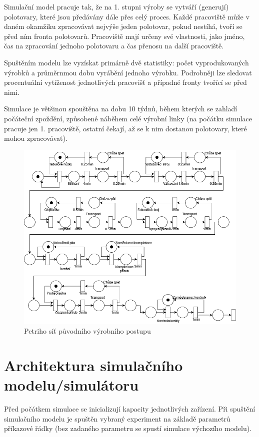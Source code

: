 \documentclass[11pt, a4paper]{article}
\begin{document}
Simulační model pracuje tak, že na 1. stupni výroby se vytváří (generují) polotovary, které jsou předávány dále přes celý proces. Každé pracoviště může v daném okamžiku zpracovávat nejvýše jeden polotovar, pokud nestíhá, tvoří se před ním fronta polotovarů. Pracoviště mají určeny své vlastnosti, jako jméno, čas na zpracování jednoho polotovaru a čas přenosu na další pracoviště.

Spuštěním modelu lze vyzískat primárně dvě statistiky: počet vyprodukovaných výrobků a průměrnmou dobu vyrábění jednoho výrobku. Podrobněji lze sledovat procentuální vytíženost jednotlivých pracovišť a případné fronty tvořící se před nimi.

Simulace je většinou spouštěna na dobu\cite[str. 21]{ims} 10 týdnů, během kterých se zahladí počáteční zpoždění, způsobené náběhem celé výrobní linky (na počátku simulace pracuje jen 1. pracoviště, ostatní čekají, až se k nim dostanou polotovary, které mohou zpracovávat).


\begin{figure}[H]
    \centering
    \includegraphics[width=17cm]{orig}
    \caption{Petriho síť\cite[str. 123]{ims} původního výrobního postupu}
    \label{orig}
\end{figure}

\section{Architektura simulačního modelu/simulátoru}
Před počátkem simulace se inicializují kapacity jednotlivých zařízení. Při spuštění simulačního modelu je spuštěn vybraný experiment na základě parametrů příkazové řádky (bez zadaného parametru se spustí simulace výchozího modelu).
\end{document}
